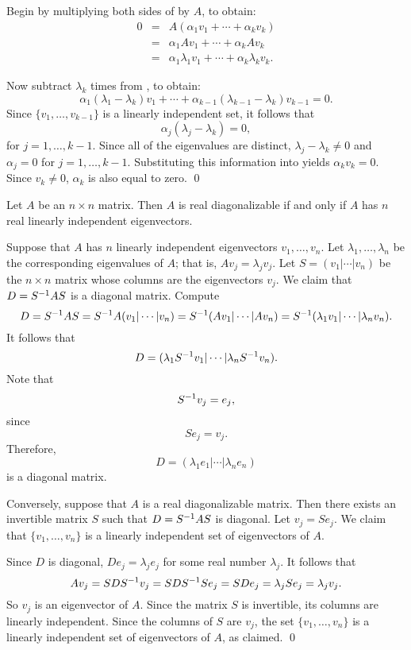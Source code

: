 Begin by multiplying both sides of  by $A$, to
obtain: 
\begin{eqnarray}
0 & = & A(\alpha_1 v_1 + \cdots + \alpha_k v_k) \nonumber \\
& = & \alpha_1 Av_1 + \cdots + \alpha_k Av_k \label{e:linother}\\
& = & \alpha_1 \lambda_1 v_1 + \cdots + \alpha_k \lambda_k v_k.\nonumber
\end{eqnarray}

Now subtract $\lambda_k$ times  from ,
to obtain:
\[
\alpha_1(\lambda_1-\lambda_k)v_1 + \cdots +
\alpha_{k-1}(\lambda_{k-1}-\lambda_k)v_{k-1} = 0.
\]
Since $\{v_1,\ldots,v_{k-1}\}$ is a linearly independent set, it
follows that 
\[
\alpha_j(\lambda_j-\lambda_k)=0,
\]
for $j=1,\ldots,k-1$.  Since all of the eigenvalues are
distinct, $\lambda_j-\lambda_k\neq 0$ and $\alpha_j=0$ for
$j=1,\ldots,k-1$. Substituting this information into
 yields $\alpha_k v_k=0$.  Since $v_k\neq 0$, 
$\alpha_k$ is also equal to zero.  \qed

\begin{lemma}  \label{L:eigenv-diag}
Let $A$ be an $n\times n$ matrix.  Then $A$ is real diagonalizable if
and only if $A$ has $n$ real linearly independent 
eigenvectors.
\end{lemma}  

\proof  Suppose that $A$ has $n$ linearly independent eigenvectors 
$v_1,\ldots,v_n$.  Let $\lambda_1,\ldots,\lambda_n$ be the 
corresponding eigenvalues of $A$; that is, $Av_j=\lambda_jv_j$.
Let $S=(v_1|\cdots|v_n)$ be the $n\times n$ matrix whose columns are the 
eigenvectors $v_j$.  We claim that $D=S^{-1} AS$ is a diagonal matrix.
Compute
\[
D=S^{-1} AS=S^{-1} A(v_1|\cdots|v_n)=S^{-1}(Av_1|\cdots|Av_n)=
S^{-1}(\lambda_1v_1|\cdots|\lambda_nv_n).
\]
It follows that 
\[
D=(\lambda_1S^{-1} v_1|\cdots|\lambda_nS^{-1} v_n).
\]
Note that 
\[
S^{-1} v_j=e_j,
\]
since
\[
Se_j = v_j.
\]
Therefore,
\[
D= (\lambda_1e_1|\cdots|\lambda_ne_n)
\]
is a diagonal matrix.  

Conversely, suppose that $A$ is a real diagonalizable matrix.  Then there
exists an invertible matrix $S$ such that $D=S^{-1} AS$ is diagonal.  Let
$v_j = Se_j$.  We claim that $\{v_1,\ldots,v_n\}$ is a linearly independent 
set of eigenvectors of $A$.

Since $D$ is diagonal, $De_j=\lambda_je_j$ for some real number $\lambda_j$. 
It follows that
\[
Av_j = SDS^{-1} v_j = SDS^{-1} Se_j = SDe_j = \lambda_j Se_j = \lambda_jv_j.
\]  
So $v_j$ is an eigenvector of $A$.  Since the matrix $S$ is invertible, its
columns are linearly independent.  Since the columns of $S$ are $v_j$, the
set $\{v_1,\ldots,v_n\}$ is a linearly independent set of eigenvectors of
$A$, as claimed. \qed



